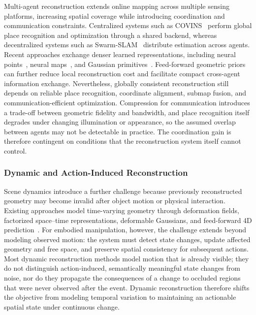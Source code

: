 \documentclass{SCIS2026}
\begin{document}
Multi-agent reconstruction extends online mapping across multiple sensing platforms, increasing spatial coverage while introducing coordination and communication constraints. Centralized systems such as COVINS~\cite{schmuck2021covins} perform global place recognition and optimization through a shared backend, whereas decentralized systems such as Swarm-SLAM~\cite{lajoie2023swarm} distribute estimation across agents. Recent approaches exchange denser learned representations, including neural points~\cite{hu2023cp}, neural maps~\cite{deng2025mne}, and Gaussian primitives~\cite{yugay2025magic}. Feed-forward geometric priors can further reduce local reconstruction cost and facilitate compact cross-agent information exchange. Nevertheless, globally consistent reconstruction still depends on reliable place recognition, coordinate alignment, submap fusion, and communication-efficient optimization. Compression for communication introduces a trade-off between geometric fidelity and bandwidth, and place recognition itself degrades under changing illumination or appearance, so the assumed overlap between agents may not be detectable in practice. The coordination gain is therefore contingent on conditions that the reconstruction system itself cannot control.

\subsubsection{Dynamic and Action-Induced Reconstruction}

Scene dynamics introduce a further challenge because previously reconstructed geometry may become invalid after object motion or physical interaction. Existing approaches model time-varying geometry through deformation fields, factorized space--time representations, deformable Gaussians, and feed-forward 4D prediction~\cite{newcombe2015dynamicfusion,pumarola2021d,fridovich2023k,yang2024deformable,luiten2024dynamic,zhang2026efficiently}. For embodied manipulation, however, the challenge extends beyond modeling observed motion: the system must detect state changes, update affected geometry and free space, and preserve spatial consistency for subsequent actions. Most dynamic reconstruction methods model motion that is already visible; they do not distinguish action-induced, semantically meaningful state changes from noise, nor do they propagate the consequences of a change to occluded regions that were never observed after the event. Dynamic reconstruction therefore shifts the objective from modeling temporal variation to maintaining an actionable spatial state under continuous change.
\end{document}
